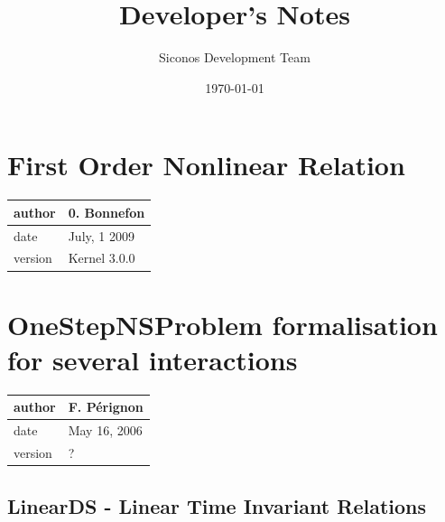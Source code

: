 \documentclass[10pt]{report}
\begin{document}
\thispagestyle{empty}
\title{Developer's Notes}
\author{Siconos Development Team}

\date{\today}
\maketitle

\pagestyle{fancy}
\chapter{First Order Nonlinear Relation }

\begin{table}[!ht]
  \begin{tabular}{|l|l|}
    \hline
    author  & 0. Bonnefon \\
    \hline
    date    & July, 1 2009 \\ 
    \hline
    version & Kernel 3.0.0 \\
    \hline
  \end{tabular}
\end{table}
\chapter{OneStepNSProblem formalisation for several interactions}

\begin{table}[!ht]
  \begin{tabular}{|l|l|}
    \hline
    author  & F. P\'erignon \\
    \hline
    date    & May 16, 2006 \\ 
    \hline
    version & ? \\
    \hline
  \end{tabular}
\end{table}



\section{LinearDS - Linear Time Invariant Relations}
\end{document}
